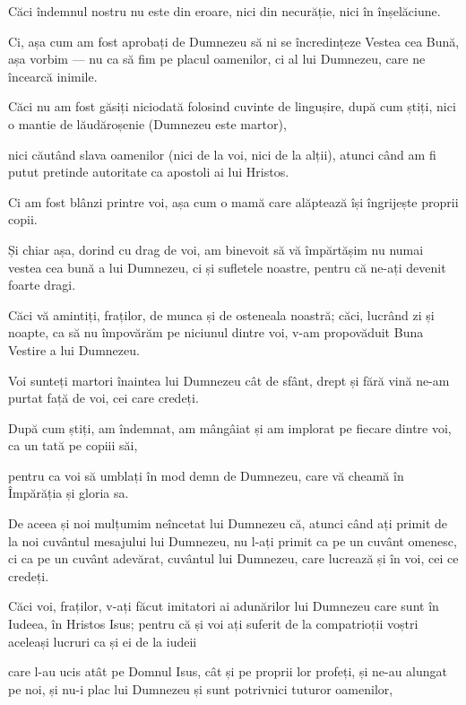 {Căci îndemnul nostru nu este din eroare, nici din necurăție, nici în înșelăciune.

Ci, așa cum am fost aprobați de Dumnezeu să ni se încredințeze Vestea cea Bună, așa vorbim — nu ca să fim pe placul oamenilor, ci al lui Dumnezeu, care ne încearcă inimile.

Căci nu am fost găsiți niciodată folosind cuvinte de lingușire, după cum știți, nici o mantie de lăudăroșenie (Dumnezeu este martor),

nici căutând slava oamenilor (nici de la voi, nici de la alții), atunci când am fi putut pretinde autoritate ca apostoli ai lui Hristos.

Ci am fost blânzi printre voi, așa cum o mamă care alăptează își îngrijește proprii copii.


\par }{\PP {}Și chiar așa, dorind cu drag de voi, am binevoit să vă împărtășim nu numai vestea cea bună a lui Dumnezeu, ci și sufletele noastre, pentru că ne-ați devenit foarte dragi.

Căci vă amintiți, fraților, de munca și de osteneala noastră; căci, lucrând zi și noapte, ca să nu împovărăm pe niciunul dintre voi, v-am propovăduit Buna Vestire a lui Dumnezeu.

Voi sunteți martori înaintea lui Dumnezeu cât de sfânt, drept și fără vină ne-am purtat față de voi, cei care credeți.

După cum știți, am îndemnat, am mângâiat și am implorat pe fiecare dintre voi, ca un tată pe copiii săi,

pentru ca voi să umblați în mod demn de Dumnezeu, care vă cheamă în Împărăția și gloria sa.


\par }{\PP {}De aceea și noi mulțumim neîncetat lui Dumnezeu că, atunci când ați primit de la noi cuvântul mesajului lui Dumnezeu, nu l-ați primit ca pe un cuvânt omenesc, ci ca pe un cuvânt adevărat, cuvântul lui Dumnezeu, care lucrează și în voi, cei ce credeți.

Căci voi, fraților, v-ați făcut imitatori ai adunărilor lui Dumnezeu care sunt în Iudeea, în Hristos Isus; pentru că și voi ați suferit de la compatrioții voștri aceleași lucruri ca și ei de la iudeii

care l-au ucis atât pe Domnul Isus, cât și pe proprii lor profeți, și ne-au alungat pe noi, și nu-i plac lui Dumnezeu și sunt potrivnici tuturor oamenilor,

}
